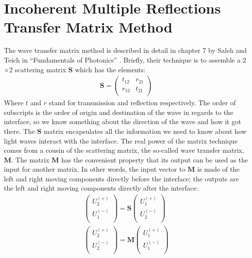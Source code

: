 \documentclass[osajnl,preprint,showpacs,superscriptaddress,12pt]{revtex4-1} %
\begin{document}
\section{Incoherent Multiple Reflections Transfer Matrix Method}
\label{sec:Append-IMRTMM}

The wave transfer matrix method is described in detail in chapter 7 by Saleh and Teich in ``Fundamentals of Photonics'' \cite{2007fuph.book.....S}.  Briefly, their technique is to assemble a 2$\times$2 scattering matrix $\boldsymbol{S}$ which has the elements:
\begin{eqnarray}
\boldsymbol{S} = \left(
\begin{array}{cc}
 t_{12} & r_{21} \\
 r_{12} & t_{21} \\
\end{array}
\right)
\end{eqnarray}
Where $t$ and $r$ stand for transmission and reflection respectively.  The order of subscripts is the order of origin and destination of the wave in regards to the interface, so we know something about the direction of the wave and how it got there.  The $\boldsymbol{S}$ matrix encapsulates all the information we need to know about how light waves interact with the interface.  The real power of the matrix technique comes from a cousin of the scattering matrix, the so-called wave transfer matrix, $\boldsymbol{M}$.  The matrix $\boldsymbol{M}$ has the convenient property that its output can be used as the input for another matrix.  In other words, the input vector to $\boldsymbol{M}$ is made of the left and right moving components directly before the interface; the outputs are the left and right moving components directly after the interface:
\begin{eqnarray}
\left(
\begin{array}{c}
 U_2^{(+)} \\
 U_1^{(-)} \\
\end{array}
\right)=\boldsymbol{S} \left(
\begin{array}{c}
 U_1^{(+)} \\
 U_2^{(-)} \\
\end{array}
\right) \\
\left(
\begin{array}{c}
 U_2^{(+)} \\
 U_2^{(-)} \\
\end{array}
\right)=\boldsymbol{M} \left(
\begin{array}{c}
 U_1^{(+)} \\
 U_1^{(-)} \\
\end{array}
\right)
\end{eqnarray}
\end{document}
